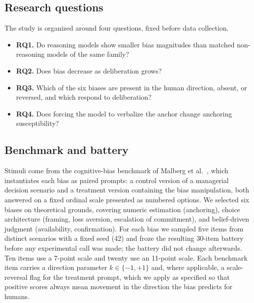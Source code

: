 \documentclass[conference]{IEEEtran}
\begin{document}
\subsection{Research questions}
The study is organized around four questions, fixed before data collection.
\begin{itemize}
\item \textbf{RQ1.} Do reasoning models show smaller bias magnitudes than matched non-reasoning models of the same family?
\item \textbf{RQ2.} Does bias decrease as deliberation grows?
\item \textbf{RQ3.} Which of the six biases are present in the human direction, absent, or reversed, and which respond to deliberation?
\item \textbf{RQ4.} Does forcing the model to verbalize the anchor change anchoring susceptibility?
\end{itemize}

\subsection{Benchmark and battery}
Stimuli come from the cognitive-bias benchmark of Malberg et al.~\cite{malberg2024comprehensive}, which instantiates each bias as paired prompts: a control version of a managerial decision scenario and a treatment version containing the bias manipulation, both answered on a fixed ordinal scale presented as numbered options. We selected six biases on theoretical grounds, covering numeric estimation (anchoring), choice architecture (framing, loss aversion, escalation of commitment), and belief-driven judgment (availability, confirmation). For each bias we sampled five items from distinct scenarios with a fixed seed (42) and froze the resulting 30-item battery before any experimental call was made; the battery did not change afterwards. Ten items use a 7-point scale and twenty use an 11-point scale. Each benchmark item carries a direction parameter $k \in \{-1, +1\}$ and, where applicable, a scale-reversal flag for the treatment prompt, which we apply as specified so that positive scores always mean movement in the direction the bias predicts for humans.
\end{document}
